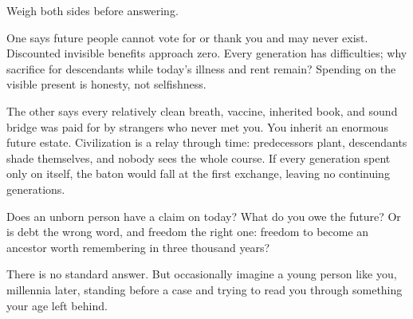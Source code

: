 Weigh both sides before answering.

One says future people cannot vote for or thank you and may never exist. Discounted invisible benefits approach zero. Every generation has difficulties; why sacrifice for descendants while today's illness and rent remain? Spending on the visible present is honesty, not selfishness.

The other says every relatively clean breath, vaccine, inherited book, and sound bridge was paid for by strangers who never met you. You inherit an enormous future estate. Civilization is a relay through time: predecessors plant, descendants shade themselves, and nobody sees the whole course. If every generation spent only on itself, the baton would fall at the first exchange, leaving no continuing generations.

Does an unborn person have a claim on today? What do you owe the future? Or is debt the wrong word, and freedom the right one: freedom to become an ancestor worth remembering in three thousand years?

There is no standard answer. But occasionally imagine a young person like you, millennia later, standing before a case and trying to read you through something your age left behind.
